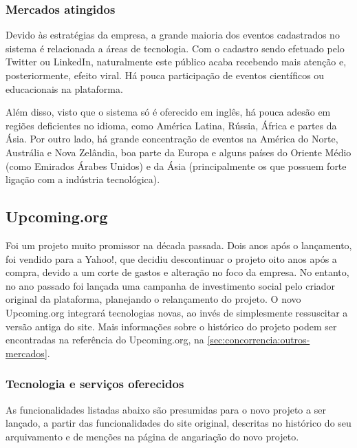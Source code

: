 \documentclass[12pt,a4paper,twoside,hyphens,english,brazil]{abntex2}
\begin{document}
\subsubsection*{Mercados atingidos}
Devido às estratégias da empresa, a grande maioria dos eventos cadastrados no sistema é relacionada a áreas de tecnologia. Com o cadastro sendo efetuado pelo Twitter ou LinkedIn, naturalmente este público acaba recebendo mais atenção e, posteriormente, efeito viral. Há pouca participação de eventos científicos ou educacionais na plataforma.

Além disso, visto que o sistema só é oferecido em inglês, há pouca adesão em regiões deficientes no idioma, como América Latina, Rússia, África e partes da Ásia. Por outro lado, há grande concentração de eventos na América do Norte, Austrália e Nova Zelândia, boa parte da Europa e alguns países do Oriente Médio (como Emirados Árabes Unidos) e da Ásia (principalmente os que possuem forte ligação com a indústria tecnológica).

\subsection{Upcoming.org}
Foi um projeto muito promissor na década passada. Dois anos após o lançamento, foi vendido para a Yahoo!, que decidiu descontinuar o projeto oito anos após a compra, devido a um corte de gastos e alteração no foco da empresa. No entanto, no ano passado foi lançada uma campanha de investimento social pelo criador original da plataforma, planejando o relançamento do projeto. O novo Upcoming.org integrará tecnologias novas, ao invés de simplesmente ressuscitar a versão antiga do site\cite{upcoming-90-min}. Mais informações sobre o histórico do projeto podem ser encontradas na referência do Upcoming.org, na \autoref{sec:concorrencia:outros-mercados}.

\subsubsection*{Tecnologia e serviços oferecidos}
As funcionalidades listadas abaixo são presumidas para o novo projeto a ser lançado, a partir das funcionalidades do site original, descritas no histórico do seu arquivamento\cite{upcoming-archive} e de menções na página de angariação do novo projeto\cite{upcoming-kickstarter}.
\end{document}
